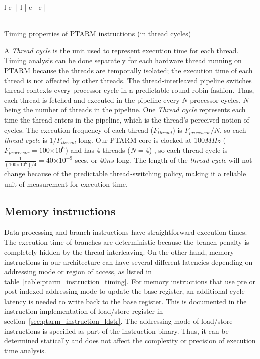 \begin{table}[h]
{\begin{smalltabular}{  l  c || l | c | c | }
   \\
   \\ \hline
\end{smalltabular}}
\vspace{1mm}
\caption{Timing properties of PTARM instructions (in thread cycles)}
\label{table:ptarm_instruction_timing}
\end{table}

\newcommand{\e}[1]{\ensuremath{\times 10^{#1}}}

A \emph{Thread cycle} is the unit used to represent execution time for each thread.  
Timing analysis can be done separately for each hardware thread running on PTARM because the threads are temporally isolated; the execution time of each thread is not affected by other threads.
The thread-interleaved pipeline switches thread contexts every processor cycle in a predictable round robin fashion. 
Thus, each thread is fetched and executed in the pipeline every $N$ processor cycles, $N$ being the number of threads in the pipeline.
One \emph{Thread cycle} represents each time the thread enters in the pipeline, which is the thread's perceived notion of cycles.
The execution frequency of each thread ($F_{thread}$) is $F_{processor}/N$, so each \emph{thread cycle} is $1/F_{thread}$ long. 
Our PTARM core is clocked at 100$MHz$ ($F_{processor} = 100\e{6}$) and has 4 threads ($N=4$) , so each thread cycle is $\frac{1}{(100\e{6})/4} = 40\e{-9}$ secs, or $40ns$ long.
The length of the \emph{thread cycle} will not change because of the predictable thread-switching policy, making it a reliable unit of measurement for execution time.   

\subsection{Memory instructions}
Data-processing and branch instructions have straightforward execution times.
The execution time of branches are deterministic because the branch penalty is completely hidden by the thread interleaving.
On the other hand, memory instructions in our architecture can have several different latencies depending on addressing mode or region of access, as listed in table~\ref{table:ptarm_instruction_timing}.
For memory instructions that use pre or post-indexed addressing mode to update the base register, an additional cycle latency is needed to write back to the base register.
This is documented in the instruction implementation of load/store register in section~\ref{sec:ptarm_instruction_ldstr}.
The addressing mode of load/store instructions is specified as part of the instruction binary.
Thus, it can be determined statically and does not affect the complexity or precision of execution time analysis. 

